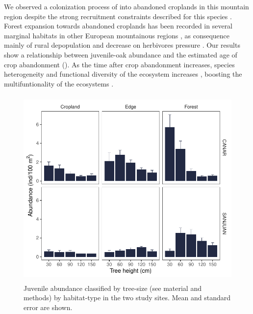 We observed a colonization process of \Qpy into abandoned croplands in this mountain region despite the strong recruitment constraints described for this species \autocites{Bravoetal2008SelviculturaMontes,Gomez2003ImpactVertebrate,Pereaetal2014InteraccionesPlantaanimal}. Forest expansion towards abandoned croplands has been recorded in several marginal habitats in other European mountainous regions \autocites{Amezteguietal2016LanduseLegacies,Nataleetal2007StudyTree,Piussi2000ExpansionEuropean,Amezteguietal2010LanduseChanges,LasantaMartinezetal2005MountainMediterranean,Kozak2003ForestCover,AlvarezMartinezetal2014InfluenceLand,VicenteSerranoetal2004AnalysisSpatial}, as consequence mainly of rural depopulation and decrease on herbivores pressure \autocite{MacDonaldetal2000AgriculturalAbandonment,EuropeanEnvironmentAgency2016EuropeanForest}. Our results show a relationship between juvenile-oak abundance and the estimated age of crop abandonment (). As the time after crop abandonment increases, species heterogeneity and functional diversity of the ecosystem increases \autocites{PuertaPineroetal2012HistoryMatters,HermyVerheyen2007LegaciesPresentday}, boosting the multifuntionality of the ecosystems \autocite{CruzAlonsoetal2019LongTerm}. 

\begin{figure}
    \centering
    \includegraphics[width=\textwidth,height=10cm,
  keepaspectratio]{img/coloniza/coloniza-TreeCategory.pdf}
    \caption{Juvenile abundance classified by tree-size (see material and methods) by habitat-type in the two study sites. Mean and standard error are shown.}
    \label{fig:coloniza:treeCategory}
\end{figure}

